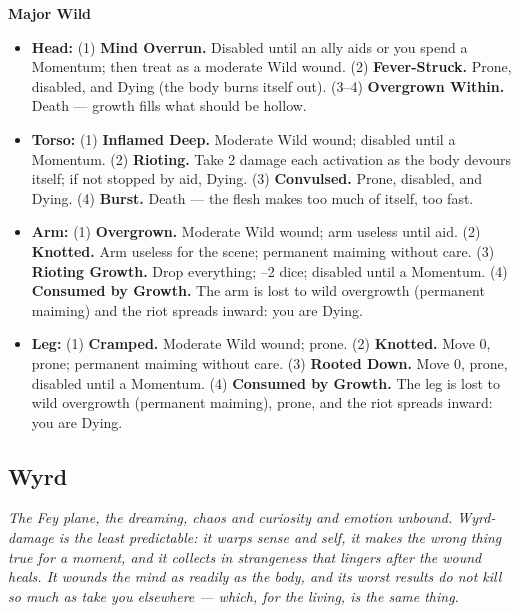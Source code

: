 \textbf{Major Wild}
\begin{itemize}
    \item \textbf{Head:} (1) \textbf{Mind Overrun.} Disabled until an ally aids or you spend a Momentum; then treat as a moderate Wild wound. (2) \textbf{Fever-Struck.} Prone, disabled, and Dying (the body burns itself out). (3--4) \textbf{Overgrown Within.} Death --- growth fills what should be hollow.
    \item \textbf{Torso:} (1) \textbf{Inflamed Deep.} Moderate Wild wound; disabled until a Momentum. (2) \textbf{Rioting.} Take 2 damage each activation as the body devours itself; if not stopped by aid, Dying. (3) \textbf{Convulsed.} Prone, disabled, and Dying. (4) \textbf{Burst.} Death --- the flesh makes too much of itself, too fast.
    \item \textbf{Arm:} (1) \textbf{Overgrown.} Moderate Wild wound; arm useless until aid. (2) \textbf{Knotted.} Arm useless for the scene; permanent maiming without care. (3) \textbf{Rioting Growth.} Drop everything; --2 dice; disabled until a Momentum. (4) \textbf{Consumed by Growth.} The arm is lost to wild overgrowth (permanent maiming) and the riot spreads inward: you are Dying.
    \item \textbf{Leg:} (1) \textbf{Cramped.} Moderate Wild wound; prone. (2) \textbf{Knotted.} Move 0, prone; permanent maiming without care. (3) \textbf{Rooted Down.} Move 0, prone, disabled until a Momentum. (4) \textbf{Consumed by Growth.} The leg is lost to wild overgrowth (permanent maiming), prone, and the riot spreads inward: you are Dying.
\end{itemize}

\subsection{Wyrd}

\textit{The Fey plane, the dreaming, chaos and curiosity and emotion unbound. Wyrd-damage is the least predictable: it warps sense and self, it makes the wrong thing true for a moment, and it collects in strangeness that lingers after the wound heals. It wounds the mind as readily as the body, and its worst results do not kill so much as \textit{take you elsewhere} --- which, for the living, is the same thing.}

